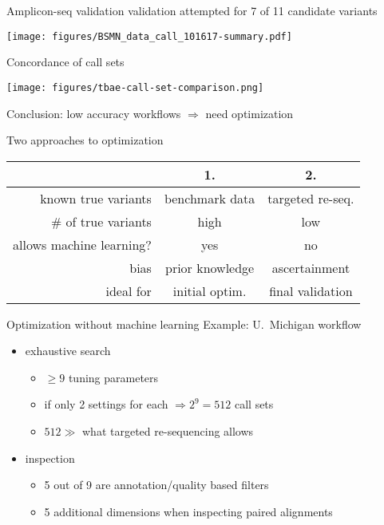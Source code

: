 \documentclass{beamer}
\begin{document}
\begin{frame}{Amplicon-seq validation}
{validation attempted for 7 of 11 candidate variants}
\begin{center}
\texttt{[image: figures/BSMN\_data\_call\_101617-summary.pdf]}
\end{center}
\end{frame}

\begin{frame}{Concordance of call sets}
\begin{center}
\texttt{[image: figures/tbae-call-set-comparison.png]}
\end{center}
\end{frame}

\begin{frame}{Conclusion: low accuracy workflows \(\Rightarrow\) need
optimization}
\begin{center}
{\Large Two approaches to optimization}
\vfill
\begin{tabular}{r|c|c}
 & 1. & 2. \\
\hline
known true variants & benchmark data & targeted re-seq. \\
\# of true variants & high & low \\
allows machine learning? & yes & no \\
bias & prior knowledge & ascertainment \\
ideal for & initial optim. & final validation \\
\end{tabular}
\end{center}
\end{frame}

\begin{frame}[label=umworkflow]{Optimization without machine learning}
{Example: U.~Michigan workflow}
\begin{itemize}
\item 
exhaustive search
\begin{itemize}
\item \(\ge 9\) tuning parameters
\item if only 2 settings for each \(\Rightarrow 2^9 = 512\) call sets
\item \(512 \gg\) what targeted re-sequencing allows
\end{itemize}
\item<2-> inspection
\begin{itemize}
\item 5 out of 9 are annotation/quality based filters
\item 5 additional dimensions when inspecting paired alignments
\end{itemize}
\end{itemize}
\end{frame}
\end{document}
